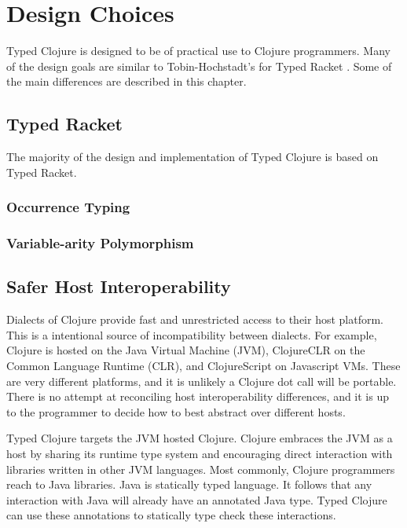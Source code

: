\chapter{Design Choices}

Typed Clojure is designed to be of practical use to Clojure programmers.
Many of the design goals are similar to Tobin-Hochstadt's 
for Typed Racket \cite{Tob10}. Some of the main differences are described in this chapter.

\section{Typed Racket}

The majority of the design and implementation of Typed Clojure is based on Typed Racket.

\subsection{Occurrence Typing}

\subsection{Variable-arity Polymorphism}

\section{Safer Host Interoperability}

Dialects of Clojure provide fast and unrestricted access to their host platform. 
This is a intentional source of incompatibility between dialects.
For example, Clojure is hosted on the Java Virtual Machine (JVM), ClojureCLR on the Common Language Runtime (CLR),
and ClojureScript on Javascript VMs. These are very different platforms, and it is unlikely
a Clojure dot call will be portable. There is no attempt at reconciling
host interoperability differences, and it is up to the programmer to decide
how to best abstract over different hosts.

Typed Clojure targets the JVM hosted Clojure.
Clojure embraces the JVM as a host by sharing its runtime type system and encouraging direct
interaction with libraries written in other JVM languages. Most commonly, Clojure programmers
reach to Java libraries. Java is statically typed language. It follows that any interaction with
Java will already have an annotated Java type. Typed Clojure can use these annotations
to statically type check these interactions.

